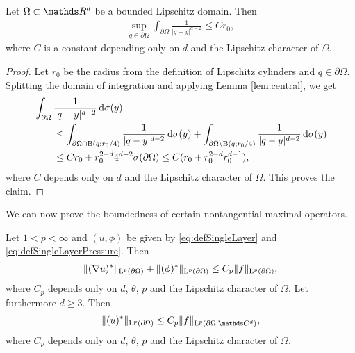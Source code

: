 \begin{lem}
  \label{lem:youngApp}
  Let $\Omega \subset \R^d$ be a bounded Lipschitz domain. Then
  \begin{align*}
    \sup_{q \in \partial\Omega} \int_{\partial\Omega} \frac{1}{|q - y|^{d - 2}} \leq C r_0,
  \end{align*}
  where $C$ is a constant depending only on $d$ and the Lipschitz character of $\Omega$.
\end{lem}

\begin{proof}
  Let $r_0$ be the radius from the definition of Lipschitz cylinders and $q \in \partial\Omega$.
  Splitting the domain of integration and applying Lemma \ref{lem:central}, we get
  \begin{align*}
    &\int_{\partial\Omega} \frac{1}{|q - y|^{d - 2}} \, {\operatorname{d}\!{\sigma}}(y) \\
    &\qquad \leq \int_{\partial\Omega \cap \mathrm{B}(q; r_0/4)} \frac{1}{|q - y|^{d - 2}} \, {\operatorname{d}\!{\sigma}}(y) + \int_{\partial\Omega \setminus \mathrm{B}(q; r_0/4)} \frac{1}{|q - y|^{d - 2}} \, {\operatorname{d}\!{\sigma}}(y) \\
    &\qquad\leq C r_0 + r_0^{2 - d} 4^{d - 2} \sigma(\partial\Omega)
    \leq C ( r_0 + r_0^{2 - d} r_0^{d - 1}),
  \end{align*}
  where $C$ depends only on $d$ and the Lipschitz character of $\Omega$.
  This proves the claim.
\end{proof}

We can now prove the boundedness of certain nontangential maximal operators.
\begin{lem}
  \label{lem:nontangentialMaximalFunctions}
  Let $1 < p < \infty$ and $(u,\phi)$ be given by \eqref{eq:defSingleLayer} and \eqref{eq:defSingleLayerPressure}.
  Then 
  \begin{align}
    \| (\nabla u)^* \|_{\mathrm{L}^p(\partial\Omega)}  +  \| (\phi)^* \|_{\mathrm{L}^p(\partial\Omega)} \leq C_p \|f\|_{\mathrm{L}^p(\partial\Omega)},
  \end{align}
  where $C_p$ depends only on $d$, $\theta$, $p$ and the Lipschitz character of $\Omega$.
  Let furthermore $d \geq 3$. Then
  \begin{align}
    \label{eq:estimateUstar}
     \|(u)^*\|_{\Ell^p(\partial\Omega)} \leq C_p \|f\|_{\Ell^p(\partial\Omega; \C^d)},
  \end{align}
  where $C_p$ depends only on $d$, $\theta$, $p$ and the Lipschitz character of $\Omega$.
\end{lem}

